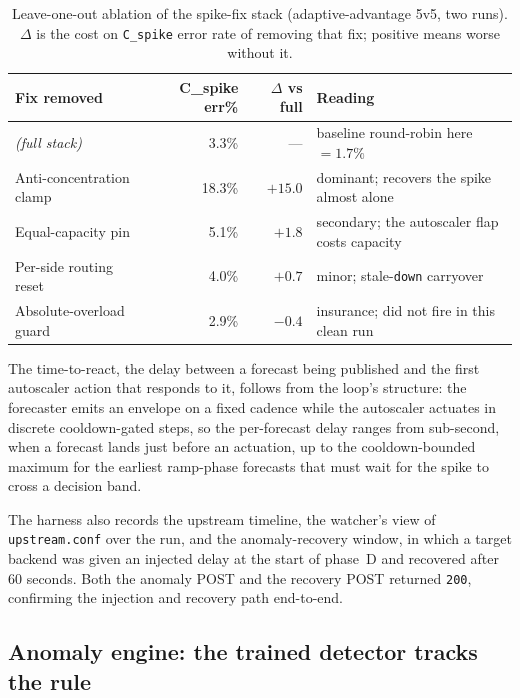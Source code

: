 \begin{table}[H]
  \centering
  \caption[Spike-fix ablation: per-fix contribution]{Leave-one-out ablation of the spike-fix stack (adaptive-advantage 5v5, two runs). $\Delta$ is the cost on \texttt{C\_spike} error rate of removing that fix; positive means worse without it.}
  \label{tab:imc:ablation}
  \small
  \begin{tabular}{@{}l r r l@{}}
    \toprule
    \textbf{Fix removed} & \textbf{C\_spike err\%} & \textbf{$\Delta$ vs full} & \textbf{Reading} \\
    \midrule
    \emph{(full stack)}            & 3.3\%  & ---    & baseline round-robin here $=1.7\%$ \\
    Anti-concentration clamp       & 18.3\% & $+15.0$ & dominant; recovers the spike almost alone \\
    Equal-capacity pin             & 5.1\%  & $+1.8$  & secondary; the autoscaler flap costs capacity \\
    Per-side routing reset         & 4.0\%  & $+0.7$  & minor; stale-\texttt{down} carryover \\
    Absolute-overload guard        & 2.9\%  & $-0.4$  & insurance; did not fire in this clean run \\
    \bottomrule
  \end{tabular}
\end{table}

The time-to-react, the delay between a forecast being published and the first autoscaler
action that responds to it, follows from the loop's structure: the forecaster emits an
envelope on a fixed cadence while the autoscaler actuates in discrete cooldown-gated
steps, so the per-forecast delay ranges from sub-second, when a forecast lands just
before an actuation, up to the cooldown-bounded maximum for the earliest ramp-phase
forecasts that must wait for the spike to cross a decision band.

The harness also records the upstream timeline, the watcher's view of
\texttt{upstream.conf} over the run, and the anomaly-recovery window, in which a target
backend was given an injected delay at the start of phase~D and recovered after 60
seconds. Both the anomaly POST and the recovery POST returned \texttt{200}, confirming
the injection and recovery path end-to-end.

\subsection{Anomaly engine: the trained detector tracks the rule}\label{imc:results_anomaly}

